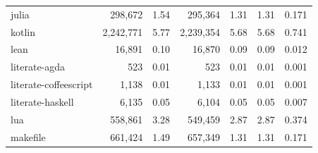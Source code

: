 \documentclass[10pt]{article} %
\begin{document}
\begin{table}[t]
{\begin{tabular}{@{\extracolsep{3pt}}lrrrrrr@{}}
julia                    & 298,672                                   & 1.54                                   & 295,364                                                & 1.31                                                & 1.31                       & 0.171                          \\
kotlin                   & 2,242,771                                 & 5.77                                   & 2,239,354                                              & 5.68                                                & 5.68                       & 0.741                          \\
lean                     & 16,891                                    & 0.10                                   & 16,870                                                 & 0.09                                                & 0.09                       & 0.012                          \\
literate-agda            & 523                                       & 0.01                                   & 523                                                    & 0.01                                                & 0.01                       & 0.001                          \\
literate-coffeescript    & 1,138                                     & 0.01                                   & 1,133                                                  & 0.01                                                & 0.01                       & 0.001                          \\
literate-haskell         & 6,135                                     & 0.05                                   & 6,104                                                  & 0.05                                                & 0.05                       & 0.007                          \\
lua                      & 558,861                                   & 3.28                                   & 549,459                                                & 2.87                                                & 2.87                       & 0.374                          \\
makefile                 & 661,424                                   & 1.49                                   & 657,349                                                & 1.31                                                & 1.31                       & 0.171                          \\

\end{tabular}}
\end{table}
\end{document}
